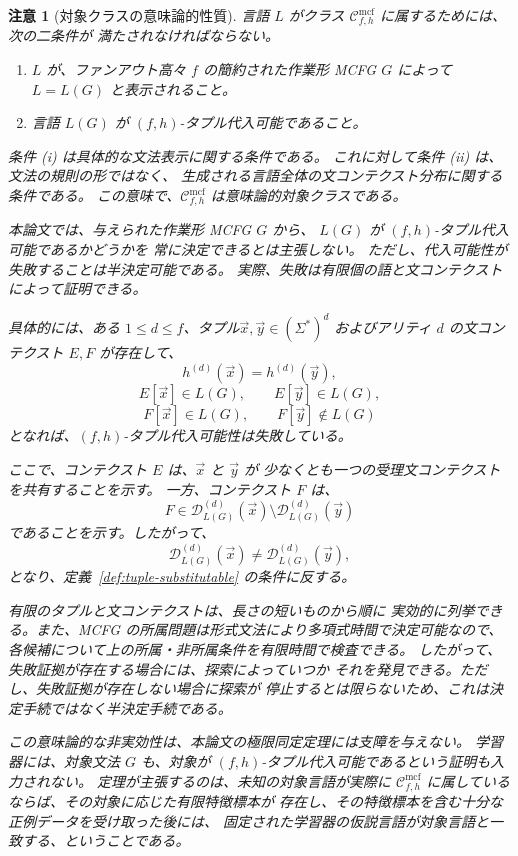 \documentclass[11pt,a4paper]{ltjsarticle}
\newtheorem{remark}[theorem]{注意}
\theoremstyle{remark}
\newcommand{\Cmcf}[2]{\mathcal{C}^{\mathrm{mcf}}_{#1,#2}}
\newcommand{\D}{\mathcal{D}}
\newcommand{\tuple}[1]{\vec{#1}}
\begin{document}
\begin{remark}[対象クラスの意味論的性質]
\label{rem:semantic-class}
言語 \(L\) がクラス \(\Cmcf{f}{h}\) に属するためには、次の二条件が
満たされなければならない。
\begin{enumerate}[label=(\roman*),leftmargin=*]
\item \(L\) が、ファンアウト高々 \(f\) の簡約された作業形 MCFG
      \(G\) によって \(L=L(G)\) と表示されること。
\item 言語 \(L(G)\) が \((f,h)\)-タプル代入可能であること。
\end{enumerate}

条件 (i) は具体的な文法表示に関する条件である。
これに対して条件 (ii) は、文法の規則の形ではなく、
生成される言語全体の文コンテクスト分布に関する条件である。
この意味で、\(\Cmcf{f}{h}\) は\emph{意味論的対象クラス}である。

本論文では、与えられた作業形 MCFG \(G\) から、
\(L(G)\) が \((f,h)\)-タプル代入可能であるかどうかを
常に決定できるとは主張しない。
ただし、代入可能性が\emph{失敗すること}は半決定可能である。
実際、失敗は有限個の語と文コンテクストによって証明できる。

具体的には、ある \(1\le d\le f\)、タプル$  \tuple x,\tuple y\in(\Sigma^*)^d$
およびアリティ \(d\) の文コンテクスト \(E,F\) が存在して、
\[
  h^{(d)}(\tuple x)=h^{(d)}(\tuple y),
\]
\[
  E[\tuple x]\in L(G),
  \qquad
  E[\tuple y]\in L(G),
\]
\[
  F[\tuple x]\in L(G),
  \qquad
  F[\tuple y]\notin L(G)
\]
となれば、\((f,h)\)-タプル代入可能性は失敗している。

ここで、コンテクスト \(E\) は、\(\tuple x\) と \(\tuple y\) が
少なくとも一つの受理文コンテクストを共有することを示す。
一方、コンテクスト \(F\) は、
\[
  F\in
  \D_{L(G)}^{(d)}(\tuple x)
  \setminus
  \D_{L(G)}^{(d)}(\tuple y)
\]
であることを示す。したがって、
\[
  \D_{L(G)}^{(d)}(\tuple x)
  \ne
  \D_{L(G)}^{(d)}(\tuple y),
\]
となり、定義~\ref{def:tuple-substitutable} の条件に反する。

有限のタプルと文コンテクストは、長さの短いものから順に
実効的に列挙できる。また、MCFG の所属問題は形式文法により多項式時間で決定可能なので、
各候補について上の所属・非所属条件を有限時間で検査できる。
したがって、失敗証拠が存在する場合には、探索によっていつか
それを発見できる。ただし、失敗証拠が存在しない場合に探索が
停止するとは限らないため、これは決定手続ではなく半決定手続である。

この意味論的な非実効性は、本論文の極限同定定理には支障を与えない。
学習器には、対象文法 \(G\) も、対象が
\((f,h)\)-タプル代入可能であるという証明も入力されない。
定理が主張するのは、未知の対象言語が実際に
\(\Cmcf{f}{h}\) に属しているならば、その対象に応じた有限特徴標本が
存在し、その特徴標本を含む十分な正例データを受け取った後には、
固定された学習器の仮説言語が対象言語と一致する、ということである。


\end{remark}
\end{document}

